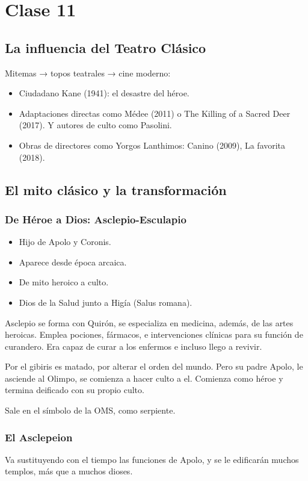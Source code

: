 \chapter{Clase 11}\label{ch:clase11}
\section{La influencia del Teatro Clásico}
Mitemas → topos teatrales → cine moderno:
\begin{itemize}
    \item Ciudadano Kane (1941): el desastre del héroe.
    \item Adaptaciones directas como Médee (2011) o The Killing of a Sacred Deer (2017). Y autores de culto como Pasolini.
    \item Obras de directores como Yorgos Lanthimos: Canino (2009), La favorita (2018).
\end{itemize}

\section{El mito clásico y la transformación}

\subsection{De Héroe a Dios: Asclepio-Esculapio}
\begin{itemize}
    \item Hijo de Apolo y Coronis.
    \item Aparece desde época arcaica.
    \item De mito heroico a culto.
    \item Dios de la Salud junto a Higía (Salus romana).
\end{itemize}

Asclepio se forma con Quirón, se especializa en medicina, además, de las artes heroicas. Emplea  pociones, fármacos, e intervenciones clínicas para su función de curandero. Era capaz de curar a los enfermos e incluso llego a revivir.

Por el gibiris es matado, por alterar el orden del mundo. Pero su padre Apolo, le asciende al Olimpo, se comienza a hacer culto a el. Comienza como héroe y termina deificado con su propio culto.

Sale en el símbolo de la OMS, como serpiente.

\subsection{El Asclepeion}
Va sustituyendo con el tiempo las funciones de Apolo, y se le edificarán muchos templos, más que a muchos dioses. 

